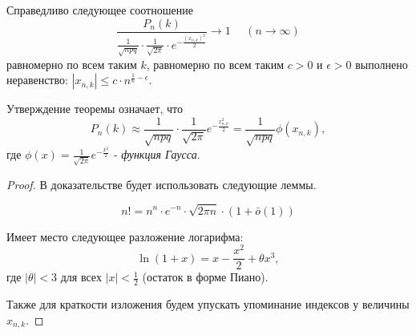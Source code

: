 \begin{theorem}
	Справедливо следующее соотношение
	\[ \dfrac{P_n(k)}{\frac{1}{\sqrt{npq}} \cdot \frac{1}{\sqrt{2 \pi}} \cdot e^{- \frac{(x_{n, k})^2}{2}}} \to 1 ~~~~~~ (n \to \infty) \]
	равномерно по всем таким $k$, равномерно по всем таким $c > 0$ и $\epsilon > 0$ выполнено неравенство: $|x_{n, k}| \le c \cdot n^{\frac{1}{6} - \epsilon}$.
	
	Утверждение теоремы означает, что
	\[ P_n(k) \approx \frac{1}{\sqrt{npq}} \cdot \frac{1}{\sqrt{2 \pi}} e^{-\frac{x_{n,k}^2}{2}} = \frac{1}{\sqrt{npq}} \phi (x_{n, k}), \]
	где $\phi(x) = \frac{1}{\sqrt{2 \pi}} e^{- \frac{x^2}{2}}$ - \textit{функция Гаусса}.
	
	\begin{proof}
		В доказательстве будет использовать следующие леммы.
		\begin{lemma}
			\[ n! = n^n \cdot e^{-n} \cdot \sqrt{2 \pi n} \cdot (1 + \bar o(1)) \]
		\end{lemma}
		\begin{lemma}
			Имеет место следующее разложение логарифма:
			\[ \ln (1 + x) = x - \frac{x^2}{2} + \theta x^3, \]
			где $|\theta| < 3$ для всех $|x| < \frac{1}{2}$ (остаток в форме Пиано).
		\end{lemma}
		Также для краткости изложения будем упускать упоминание индексов у величины $x_{n, k}$.
			

\end{proof}
\end{theorem}
